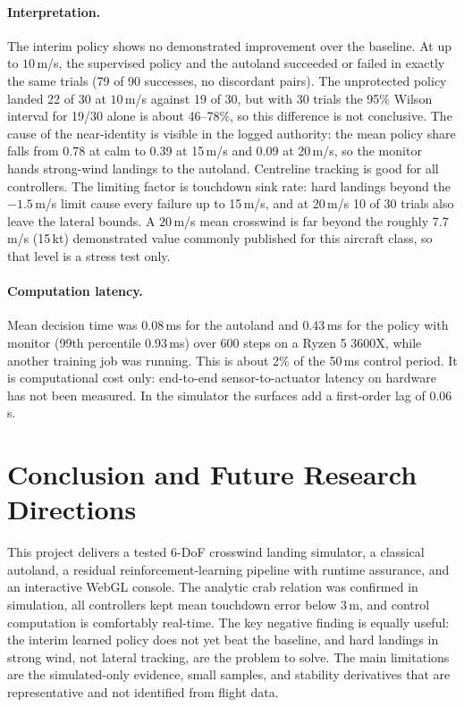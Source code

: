 \documentclass[10pt,a4paper]{article}
\begin{document}
\paragraph{Interpretation.} The interim policy shows no demonstrated improvement over
the baseline. At up to \(10\)\,m/s, the supervised policy and the autoland succeeded or
failed in exactly the same trials (79 of 90 successes, no discordant pairs). The
unprotected policy landed 22 of 30 at \(10\)\,m/s against 19 of 30, but with 30 trials the
95\% Wilson interval for 19/30 alone is about 46--78\%, so this difference is not
conclusive. The cause of the near-identity is visible in the logged authority: the
mean policy share falls from 0.78 at calm to 0.39 at 15\,m/s and 0.09 at 20\,m/s, so the
monitor hands strong-wind landings to the autoland. Centreline tracking is good for all
controllers. The limiting factor is touchdown sink rate: hard landings beyond the
\(-1.5\)\,m/s limit cause every failure up to 15\,m/s, and at 20\,m/s 10 of 30 trials also
leave the lateral bounds. A \(20\)\,m/s mean crosswind is far beyond the roughly 7.7\,m/s
(15\,kt) demonstrated value commonly published for this aircraft class, so that level is
a stress test only.

\paragraph{Computation latency.} Mean decision time was 0.08\,ms for the autoland and
0.43\,ms for the policy with monitor (99th percentile 0.93\,ms) over 600 steps on a
Ryzen 5 3600X, while another training job was running. This is about 2\% of the 50\,ms
control period. It is computational cost only: end-to-end sensor-to-actuator latency on
hardware has not been measured. In the simulator the surfaces add a first-order lag of
0.06\,s.

\section{Conclusion and Future Research Directions}

This project delivers a tested 6-DoF crosswind landing simulator, a classical autoland,
a residual reinforcement-learning pipeline with runtime assurance, and an interactive
WebGL console. The analytic crab relation was confirmed in simulation, all controllers
kept mean touchdown error below 3\,m, and control computation is comfortably real-time.
The key negative finding is equally useful: the interim learned policy does not yet beat
the baseline, and hard landings in strong wind, not lateral tracking, are the problem to
solve. The main limitations are the simulated-only evidence, small samples, and
stability derivatives that are representative and not identified from flight data.
\end{document}
